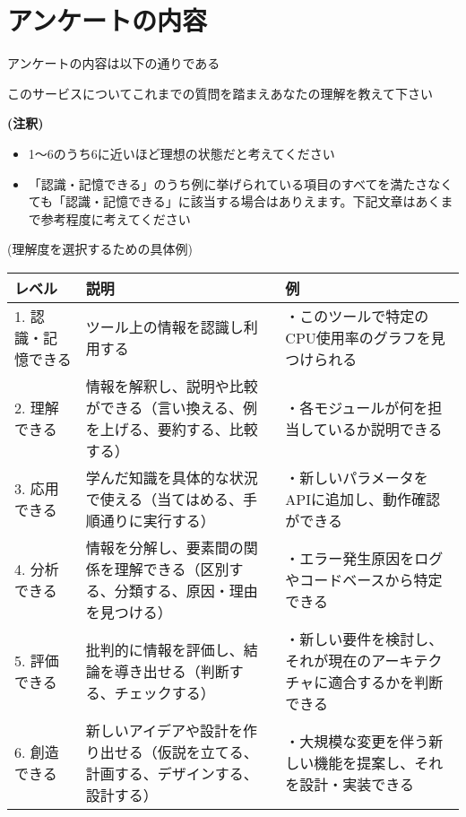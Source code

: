 \section{アンケートの内容}
アンケートの内容は以下の通りである

\vspace{0.5cm}

このサービスについてこれまでの質問を踏まえあなたの理解を教えて下さい

\textbf{(注釈)}
\begin{itemize}
    \item 1～6のうち6に近いほど理想の状態だと考えてください
    \item 「認識・記憶できる」のうち例に挙げられている項目のすべてを満たさなくても「認識・記憶できる」に該当する場合はありえます。下記文章はあくまで参考程度に考えてください
  \end{itemize}
(理解度を選択するための具体例)

\renewcommand{\arraystretch}{1.5} %
\scriptsize
\begin{tabular}{|p{1.3cm}|p{2.4cm}|p{2.9cm}|}
    \hline
    \textbf{レベル} & \textbf{説明} & \textbf{例} \\
    \hline
    1. 認識・記憶できる & ツール上の情報を認識し利用する & ・このツールで特定のCPU使用率のグラフを見つけられる \\
    \hline
    2. 理解できる & 情報を解釈し、説明や比較ができる（言い換える、例を上げる、要約する、比較する） & ・各モジュールが何を担当しているか説明できる \\
    \hline
    3. 応用できる & 学んだ知識を具体的な状況で使える（当てはめる、手順通りに実行する） & ・新しいパラメータをAPIに追加し、動作確認ができる \\
    \hline
    4. 分析できる & 情報を分解し、要素間の関係を理解できる（区別する、分類する、原因・理由を見つける） & ・エラー発生原因をログやコードベースから特定できる \\
    \hline
    5. 評価できる & 批判的に情報を評価し、結論を導き出せる（判断する、チェックする） & ・新しい要件を検討し、それが現在のアーキテクチャに適合するかを判断できる \\
    \hline
    6. 創造できる & 新しいアイデアや設計を作り出せる（仮説を立てる、計画する、デザインする、設計する） & ・大規模な変更を伴う新しい機能を提案し、それを設計・実装できる \\
    \hline
    \end{tabular}
\normalsize %

